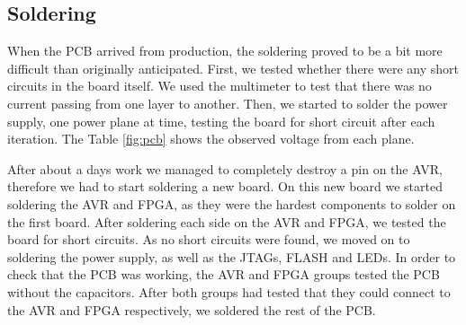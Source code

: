 \subsection{Soldering}


When the \ac{PCB} arrived from production, the soldering proved
to be a bit more difficult than originally anticipated.
First, we tested whether
there were any short circuits in the board itself. We used the multimeter to test that
there was no current passing from one layer to another. Then, we started to solder the power supply, one power plane at time, testing the board for short
circuit after each iteration. The Table \ref{fig:pcb} shows the observed voltage from each plane.




After about a days work we managed to completely destroy a pin on the AVR,
therefore we had to start soldering a new board. On this new board we
started soldering the AVR and \ac{FPGA}, as they were the hardest components to
solder on the first board. After soldering each side on the AVR and \ac{FPGA}, 
we tested the board for short circuits. As no short circuits were found, 
we moved on to soldering the power supply, as well as the \acp{JTAG}, FLASH 
and \acp{LED}. In order to check that the \ac{PCB} was working, the
AVR and \ac{FPGA} groups tested the \ac{PCB} without the capacitors. 
After both groups had tested that they could connect to the AVR and \ac{FPGA}
respectively, we soldered the rest of the \ac{PCB}.
